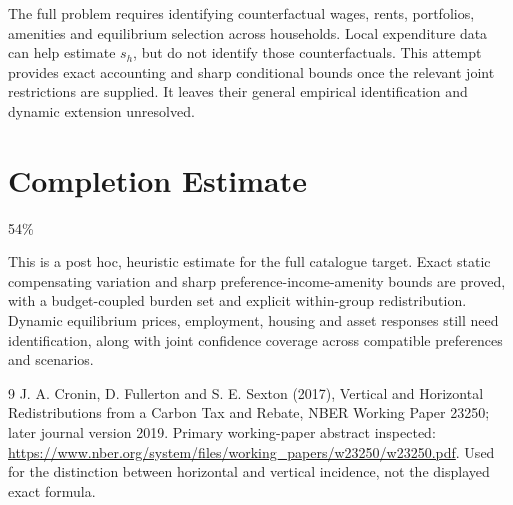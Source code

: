 \documentclass[11pt]{article}
\begin{document}
The full problem requires identifying counterfactual wages, rents, portfolios, amenities and equilibrium selection across households. Local expenditure data can help estimate $s_h$, but do not identify those counterfactuals. This attempt provides exact accounting and sharp conditional bounds once the relevant joint restrictions are supplied. It leaves their general empirical identification and dynamic extension unresolved.

\section{Completion Estimate}
54\%

This is a post hoc, heuristic estimate for the full catalogue target.
Exact static compensating variation and sharp preference-income-amenity bounds are proved, with a budget-coupled burden set and explicit within-group redistribution. Dynamic equilibrium prices, employment, housing and asset responses still need identification, along with joint confidence coverage across compatible preferences and scenarios.

\begin{thebibliography}{9}
 J. A. Cronin, D. Fullerton and S. E. Sexton (2017), Vertical and Horizontal Redistributions from a Carbon Tax and Rebate, NBER Working Paper 23250; later journal version 2019. Primary working-paper abstract inspected: \url{https://www.nber.org/system/files/working_papers/w23250/w23250.pdf}. Used for the distinction between horizontal and vertical incidence, not the displayed exact formula.
\end{thebibliography}
\end{document}
